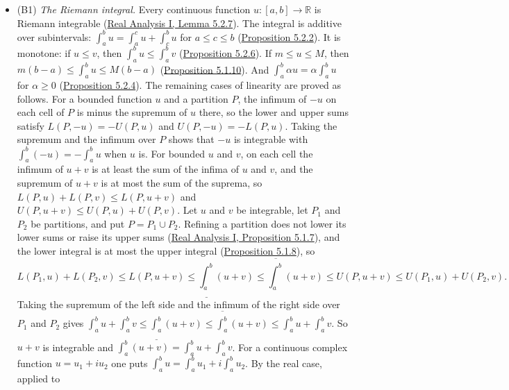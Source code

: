 \documentclass[
  english,
  11pt,
  a4paper,
]{article}
\providecommand{\tightlist}{%
  \setlength{\itemsep}{0pt}\setlength{\parskip}{0pt}}
\begin{document}
\begin{itemize}
\tightlist
\item
  (B1) \emph{The Riemann integral.} Every continuous function
  \(u:[a,b]\to\mathbb R\) is Riemann integrable
  (\href{https://www.jirka.org/ra/html/sec_rintprop.html\#lemma_contint}{Real
  Analysis I, Lemma 5.2.7}). The integral is additive over subintervals:
  \(\int_a^bu=\int_a^cu+\int_c^bu\) for \(a\leq c\leq b\)
  (\href{https://www.jirka.org/ra/html/sec_rintprop.html\#sec_rintprop-3-5}{Proposition
  5.2.2}). It is monotone: if \(u\leq v\), then
  \(\int_a^bu\leq\int_a^bv\)
  (\href{https://www.jirka.org/ra/html/sec_rintprop.html\#sec_rintprop-4-8}{Proposition
  5.2.6}). If \(m\leq u\leq M\), then \(m(b-a)\leq\int_a^bu\leq M(b-a)\)
  (\href{https://www.jirka.org/ra/html/sec_rint.html\#intbound_prop}{Proposition
  5.1.10}). And \(\int_a^b\alpha u=\alpha\int_a^bu\) for \(\alpha\geq0\)
  (\href{https://www.jirka.org/ra/html/sec_rintprop.html\#prop_integrallinear}{Proposition
  5.2.4}). The remaining cases of linearity are proved as follows. For a
  bounded function \(u\) and a partition \(P\), the infimum of \(-u\) on
  each cell of \(P\) is minus the supremum of \(u\) there, so the lower
  and upper sums satisfy \(L(P,-u)=-U(P,u)\) and \(U(P,-u)=-L(P,u)\).
  Taking the supremum and the infimum over \(P\) shows that \(-u\) is
  integrable with \(\int_a^b(-u)=-\int_a^bu\) when \(u\) is. For bounded
  \(u\) and \(v\), on each cell the infimum of \(u+v\) is at least the
  sum of the infima of \(u\) and \(v\), and the supremum of \(u+v\) is
  at most the sum of the suprema, so \(L(P,u)+L(P,v)\leq L(P,u+v)\) and
  \(U(P,u+v)\leq U(P,u)+U(P,v)\). Let \(u\) and \(v\) be integrable, let
  \(P_1\) and \(P_2\) be partitions, and put \(P=P_1\cup P_2\). Refining
  a partition does not lower its lower sums or raise its upper sums
  (\href{https://www.jirka.org/ra/html/sec_rint.html\#prop_refinement}{Real
  Analysis I, Proposition 5.1.7}), and the lower integral is at most the
  upper integral
  (\href{https://www.jirka.org/ra/html/sec_rint.html\#intulbound_prop}{Proposition
  5.1.8}), so
  \[L(P_1,u)+L(P_2,v)\leq L(P,u+v)\leq\underline{\int_a^b}(u+v)\leq\overline{\int_a^b}(u+v)\leq U(P,u+v)\leq U(P_1,u)+U(P_2,v).\]
  Taking the supremum of the left side and the infimum of the right side
  over \(P_1\) and \(P_2\) gives
  \(\int_a^bu+\int_a^bv\leq\underline{\int_a^b}(u+v)\leq\overline{\int_a^b}(u+v)\leq\int_a^bu+\int_a^bv\).
  So \(u+v\) is integrable and \(\int_a^b(u+v)=\int_a^bu+\int_a^bv\).
  For a continuous complex function \(u=u_1+iu_2\) one puts
  \(\int_a^bu=\int_a^bu_1+i\int_a^bu_2\). By the real case, applied to

\end{itemize}
\end{document}
